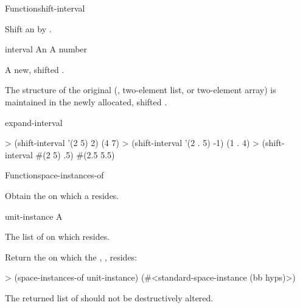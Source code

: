 \documentclass[10pt,twoside,english,pdftex]{article}
\begin{document}
\begin{functiondoc}{Function}{shift-interval}%
  { \returns{} }
%
%

\fnsyntax

\fnpurpose Shift an  by .

\fnpackage {}

\fnmodule {}

\fnargs
\begin{args}{interval}
\arg[interval] An 
\arg[amount] A number
\end{args}

\fnreturns A new, shifted .

\fndescription The structure of the original 
(, two-element list, or two-element array) is maintained in the
newly allocated, shifted .

\begin{alsos}{expand-interval}
\end{alsos}

\fnexamples
\begin{example}
> (shift-interval '(2 5) 2)
(4 7)
> (shift-interval '(2 . 5) -1)
(1 . 4)
> (shift-interval #(2 5) .5)
#(2.5 5.5)
\end{example}

\end{functiondoc}


\begin{functiondoc}{Function}{space-instances-of}%
  { \returns{} }
%
%

\fnsyntax

\fnpurpose Obtain the  on which a
 resides. 

\fnpackage {}

\fnmodule {}

\fnargs
\begin{args}{unit-instance}
 A 
\end{args}

\fnreturns The list of  on which
 resides.

\fnexample
Return the  on which the ,
, resides:
\begin{example}
> (space-instances-of unit-instance)
(#<standard-space-instance (bb hyps)>)
\end{example}

\fnnote The returned list of  should not be
destructively altered.

\end{functiondoc}
\end{document}
